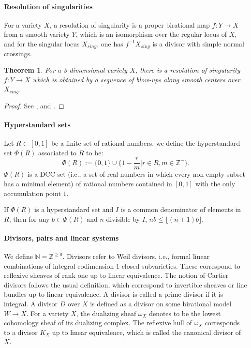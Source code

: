\documentclass[letterpaper,reqno,12pt]{amsart}
\newcommand{\tbf}{\textbf}
\numberwithin{equation}{section}
\theoremstyle{plain}
\newtheorem{theorem}{Theorem}[section]
\begin{document}
\paragraph{\tbf{Resolution of singularities}}
For a variety $X$, a resolution of singularity is a proper birational map $f:Y\to X$ from a smooth variety $Y$, which is an isomorphism over the regular locus of $X$, and for the singular locus $X_{sing}$, one has $f^{-1}X_{sing}$ is a divisor with simple normal crossings. 
\begin{theorem}
    For a 3-dimensional variety $X$, there is a resolution of singularity $f:Y\to X$ which is obtained by a sequence of blow-ups along smooth centers over $X_{sing}$.
\end{theorem}
\begin{proof}
    See \cite{Cutkosky2004ResolutionOS}, \cite{Cossart2008ResolutionOS} and \cite{Cossart2009RESOLUTIONOS}.
\end{proof} 

\paragraph{\tbf{Hyperstandard sets}}
Let $R\subset [0,1]$ be a finite set of rational numbers, we define the hyperstandard set $\Phi(R)$ associated to $R$ to be:
\[\Phi(R):=\{0,1\}\cup\{1-\frac{r}{m}|r\in R, m\in \mathbb Z^+\}.\]
$\Phi(R)$ is a DCC set (i.e., a set of real numbers in which every non-empty subset has a minimal element) of rational numbers contained in $[0,1]$ with the only accumulation point $1$.

If $\Phi(R)$ is a hyperstandard set and $I$ is a common denominator of elements in $R$, then for any $b\in \Phi(R)$ and $n$ divisible by $I$, $nb\leq\lfloor (n+1)b\rfloor$.

\paragraph{\tbf{Divisors, pairs and linear systems}} We define $\mathbb N=\mathbb Z^{\geq0}$. Divisors refer to Weil divisors, i.e., formal linear combinations of integral codimension-1 closed subvarieties. These correspond to reflexive sheaves of rank one up to linear equivalence. The notion of Cartier divisors follows the usual definition, which correspond to invertible sheaves or line bundles up to linear equivalence. A divisor is called a prime divisor if it is integral. A divisor $D$ over $X$ is defined as a divisor on some birational model $W\to X$. For a variety $X$, the dualizing sheaf $\omega_X$ denotes to be the lowest cohomology sheaf of its dualizing complex. The reflexive hull of $\omega_X$ corresponds to a divisor $K_X$ up to linear equivalence, which is called the canonical divisor of $X$. 
\end{document}
